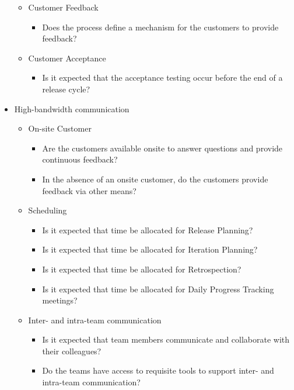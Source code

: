 \begin{appendices}
\begin{itemize}
\begin{itemize}
			\item Customer Feedback
				\begin{itemize}
					\item Does the process define a mechanism for the customers to provide feedback?
				\end{itemize}			
		\end{itemize}
		\begin{itemize}
			\item Customer Acceptance
				\begin{itemize}
					\item Is it expected that the acceptance testing occur before the end of a release cycle?
				\end{itemize}
		\end{itemize}
	\item High-bandwidth communication
		\begin{itemize}
			\item On-site Customer
				\begin{itemize}
					\item Are the customers available onsite to answer questions and provide continuous feedback? 
					\item In the absence of an onsite customer, do the customers provide feedback via other means? 
				\end{itemize}	
			\item Scheduling
				\begin{itemize}
					\item Is it expected that time be allocated for Release Planning?
					\item Is it expected that time be allocated for Iteration Planning?
					\item Is it expected that time be allocated for Retrospection? 
					\item Is it expected that time be allocated for Daily Progress Tracking meetings?
				\end{itemize}
			\item Inter- and intra-team communication
				\begin{itemize}
					\item Is it expected that team members communicate and collaborate with their colleagues?
					\item Do the teams have access to requisite tools to support inter- and intra-team communication?
				\end{itemize}

\end{itemize}
\end{itemize}
\end{appendices}
